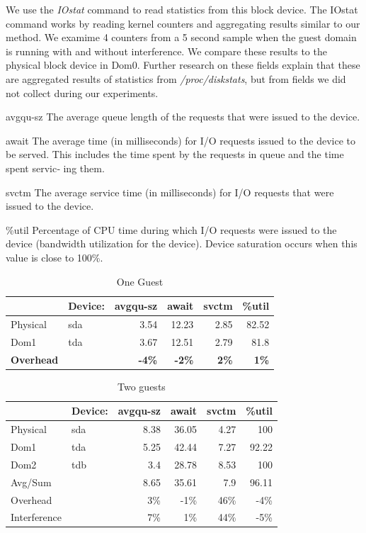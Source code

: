 We use the \emph{IOstat} command to read statistics from this block device.  The IOstat command works by reading kernel counters and aggregating results similar to our method.  We examime 4 counters from a 5 second sample when the guest domain is running with and without interference.  We compare these results to the physical block device in Dom0.
Further research on these fields explain that these are aggregated results of statistics from \emph{/proc/diskstats}, but from fields we did not collect during our experiments.


\begin{description}
	\item{avgqu-sz} The average queue length of the requests that were issued to the device.
	\item{await} The average  time  (in  milliseconds)  for  I/O  requests issued to the device to be served. This includes the time spent by the requests in queue and the time spent servic‐ ing them.
	\item{svctm} The  average  service  time  (in  milliseconds)  for  I/O requests that were issued to the device. 
	\item{\%util} Percentage of CPU time during  which  I/O  requests  were issued  to  the  device  (bandwidth  utilization  for the device). Device saturation  occurs  when  this  value  is close to 100\%.
\end{description}

\begin{table}[htbp]
\begin{tabular}{|l|l|r|r|r|r|}
\hline
 & Device: & \multicolumn{1}{l|}{avgqu-sz} & \multicolumn{1}{l|}{await} & \multicolumn{1}{l|}{svctm} & \multicolumn{1}{l|}{\%util} \\ \hline
Physical & sda & 3.54 & 12.23 & 2.85 & 82.52 \\ \hline
Dom1 & tda & 3.67 & 12.51 & 2.79 & 81.8 \\ \hline
\textbf{Overhead} & \textbf{} & \textbf{-4\%} & \textbf{-2\%} & \textbf{2\%} & \textbf{1\%} \\ \hline
\end{tabular}
\caption{One Guest}
\label{1guest}
\end{table}

\begin{table}[htbp]
\begin{tabular}{|l|l|r|r|r|r|}
\hline
 & Device: & \multicolumn{1}{l|}{avgqu-sz} & \multicolumn{1}{l|}{await} & \multicolumn{1}{l|}{svctm} & \multicolumn{1}{l|}{\%util} \\ \hline
Physical & sda & 8.38 & 36.05 & 4.27 & 100 \\ \hline
Dom1 & tda & 5.25 & 42.44 & 7.27 & 92.22 \\ \hline
Dom2 & tdb & 3.4 & 28.78 & 8.53 & 100 \\ \hline
Avg/Sum &  & 8.65 & 35.61 & 7.9 & 96.11 \\ \hline
Overhead &  & 3\% & -1\% & 46\% & -4\% \\ \hline
Interference &  & 7\% & 1\% & 44\% & -5\% \\ \hline
\end{tabular}
\caption{Two guests}
\label{2guest}
\end{table}

